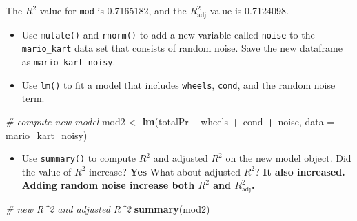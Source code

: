 \documentclass[]{book}
\newenvironment{Shaded}{\begin{snugshade}}{\end{snugshade}}
\newcommand{\KeywordTok}[1]{\textcolor[rgb]{0.13,0.29,0.53}{\textbf{#1}}}
\newcommand{\DataTypeTok}[1]{\textcolor[rgb]{0.13,0.29,0.53}{#1}}
\newcommand{\DecValTok}[1]{\textcolor[rgb]{0.00,0.00,0.81}{#1}}
\newcommand{\StringTok}[1]{\textcolor[rgb]{0.31,0.60,0.02}{#1}}
\newcommand{\CommentTok}[1]{\textcolor[rgb]{0.56,0.35,0.01}{\textit{#1}}}
\newcommand{\OperatorTok}[1]{\textcolor[rgb]{0.81,0.36,0.00}{\textbf{#1}}}
\newcommand{\NormalTok}[1]{#1}
\providecommand{\tightlist}{%
  \setlength{\itemsep}{0pt}\setlength{\parskip}{0pt}}
\begin{document}
The \(R^2\) value for \texttt{mod} is 0.7165182, and the
\(R^2_{\text{adj}}\) value is 0.7124098.

\begin{itemize}
\tightlist
\item
  Use \texttt{mutate()} and \texttt{rnorm()} to add a new variable
  called \texttt{noise} to the \texttt{mario\_kart} data set that
  consists of random noise. Save the new dataframe as
  \texttt{mario\_kart\_noisy}.
\end{itemize}

\begin{Shaded}
\end{Shaded}

\begin{itemize}
\tightlist
\item
  Use \texttt{lm()} to fit a model that includes \texttt{wheels},
  \texttt{cond}, and the random noise term.
\end{itemize}

\begin{Shaded}
\begin{Highlighting}[]
\CommentTok{# compute new model}
\NormalTok{mod2 <-}\StringTok{ }\KeywordTok{lm}\NormalTok{(totalPr }\OperatorTok{~}\StringTok{ }\NormalTok{wheels }\OperatorTok{+}\StringTok{ }\NormalTok{cond }\OperatorTok{+}\StringTok{ }\NormalTok{noise, }\DataTypeTok{data =}\NormalTok{ mario_kart_noisy)}
\end{Highlighting}
\end{Shaded}

\begin{itemize}
\tightlist
\item
  Use \texttt{summary()} to compute \(R^2\) and adjusted \(R^2\) on the
  new model object. Did the value of \(R^2\) increase? \textbf{Yes} What
  about adjusted \(R^2\)? \textbf{It also increased.} \textbf{Adding
  random noise increase both \(R^2\) and \(R^2_{\text{adj}}\).}
\end{itemize}

\begin{Shaded}
\begin{Highlighting}[]
\CommentTok{# new R^2 and adjusted R^2}
\KeywordTok{summary}\NormalTok{(mod2)}
\end{Highlighting}
\end{Shaded}
\end{document}
